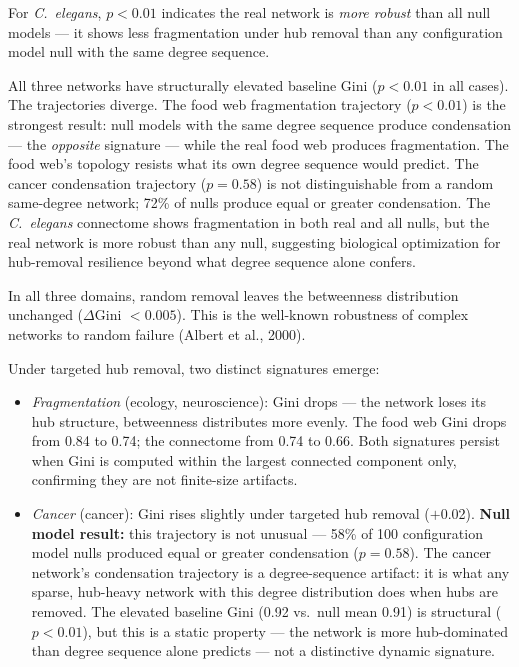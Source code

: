\documentclass[12pt,a4paper]{article}
\begin{document}
\noindent *For \textit{C.~elegans}, $p < 0.01$ indicates the real network is \emph{more robust} than all null models --- it shows less fragmentation under hub removal than any configuration model null with the same degree sequence.

All three networks have structurally elevated baseline Gini ($p < 0.01$ in all cases). The trajectories diverge. The food web fragmentation trajectory ($p < 0.01$) is the strongest result: null models with the same degree sequence produce condensation --- the \emph{opposite} signature --- while the real food web produces fragmentation. The food web's topology resists what its own degree sequence would predict. The cancer condensation trajectory ($p = 0.58$) is not distinguishable from a random same-degree network; 72\% of nulls produce equal or greater condensation. The \textit{C.~elegans} connectome shows fragmentation in both real and all nulls, but the real network is more robust than any null, suggesting biological optimization for hub-removal resilience beyond what degree sequence alone confers.

In all three domains, random removal leaves the betweenness distribution unchanged ($\Delta$Gini $< 0.005$). This is the well-known robustness of complex networks to random failure (Albert et al., 2000).

Under targeted hub removal, two distinct signatures emerge:

\begin{itemize}
  \item \emph{Fragmentation} (ecology, neuroscience): Gini drops --- the network loses its hub structure, betweenness distributes more evenly. The food web Gini drops from 0.84 to 0.74; the connectome from 0.74 to 0.66. Both signatures persist when Gini is computed within the largest connected component only, confirming they are not finite-size artifacts.

  \item \emph{Cancer} (cancer): Gini rises slightly under targeted hub removal ($+$0.02). \textbf{Null model result:} this trajectory is not unusual --- 58\% of 100 configuration model nulls produced equal or greater condensation ($p = 0.58$). The cancer network's condensation trajectory is a degree-sequence artifact: it is what any sparse, hub-heavy network with this degree distribution does when hubs are removed. The elevated baseline Gini (0.92 vs.\ null mean 0.91) is structural ($p < 0.01$), but this is a static property --- the network is more hub-dominated than degree sequence alone predicts --- not a distinctive dynamic signature.
\end{itemize}
\end{document}
